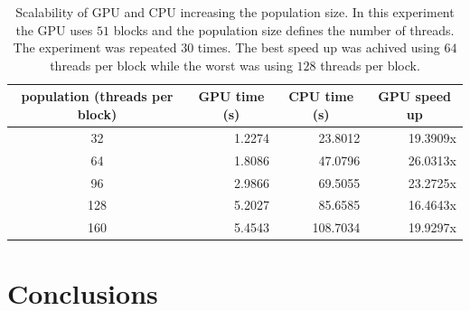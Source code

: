 \documentclass{article}
\begin{document}
    \begin{table}[!htb]
        \centering
        \caption{Scalability of GPU and CPU increasing the population size. In this experiment the GPU uses $51$ blocks and the population size defines the number of threads. The experiment was repeated $30$ times. The best speed up was achived using $64$ threads per block while the worst was using $128$ threads per block.}
        \label{tbl:scalability}
        \begin{tabular}{|c|r|r|r|}
        \hline
        \textbf{population (threads per block)} & \multicolumn{1}{c|}{\textbf{GPU time (s)}} & \multicolumn{1}{c|}{\textbf{CPU time (s)}} & \multicolumn{1}{c|}{\textbf{GPU speed up}} \\ \hline
        32                       & 1.2274                                     & 23.8012                                    & 19.3909x                                   \\ \hline
        64                       & 1.8086                                     & 47.0796                                    & 26.0313x                                   \\ \hline
        96                       & 2.9866                                     & 69.5055                                    & 23.2725x                                   \\ \hline
        128                      & 5.2027                                     & 85.6585                                    & 16.4643x                                   \\ \hline
        160                      & 5.4543                                     & 108.7034                                   & 19.9297x                                   \\ \hline
        \end{tabular}
    \end{table}


    \section{Conclusions}
\end{document}
